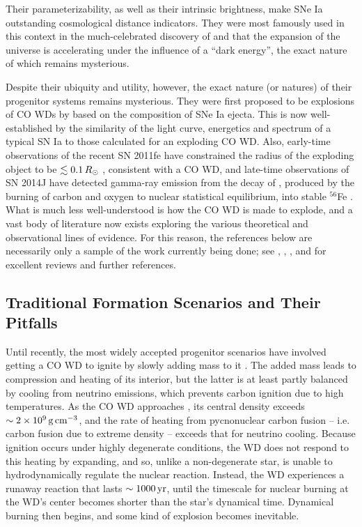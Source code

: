 Their parameterizability, as well as their intrinsic brightness, make SNe Ia outstanding cosmological distance indicators.  They were most famously used in this context in the much-celebrated discovery of \citep{ries+98} and \cite{perl+99} that the expansion of the universe is accelerating under the influence of a ``dark energy'', the exact nature of which remains mysterious.

Despite their ubiquity and utility, however, the exact nature (or natures) of their progenitor systems remains mysterious.  They were first proposed to be explosions of CO WDs by \citep{hoylf60} based on the composition of SNe Ia ejecta.  This is now well-established by the similarity of the light curve, energetics and spectrum of a typical SN Ia to those calculated for an exploding CO WD.  Also, early-time observations of the recent SN 2011fe have constrained the radius of the exploding object to be $\lesssim0.1\,\Rsun$ \citep{nuge+11, bloo+12, maozmn14}, consistent with a CO WD, and late-time observations of SN 2014J have detected gamma-ray emission from the decay of \Ni, produced by the burning of carbon and oxygen to nuclear statistical equilibrium, into stable $^{56}$Fe \citep{chur+14}.  What is much less well-understood is how the CO WD is made to explode, and a vast body of literature now exists exploring the various theoretical and observational lines of evidence.  For this reason, the references below are necessarily only a sample of the work currently being done; see \cite{howe11}, \cite{hill+13}, \cite{maozmn14}, and \cite{tsebs15} for excellent reviews and further references.

\subsection{Traditional Formation Scenarios and Their Pitfalls}
\label{ssec:old_typeia}

Until recently, the most widely accepted progenitor scenarios have involved getting a CO WD to ignite by slowly adding mass to it \citep{hilln00}.  The added mass leads to compression and heating of its interior, but the latter is at least partly balanced by cooling from neutrino emissions, which prevents carbon ignition due to high temperatures.  As the CO WD approaches \Mch, its central density exceeds $\sim2\times10^9\,\gcc$, and the rate of heating from pycnonuclear carbon fusion -- i.e. carbon fusion due to extreme density -- exceeds that for neutrino cooling.  Because ignition occurs under highly degenerate conditions, the WD does not respond to this heating by expanding, and so, unlike a non-degenerate star, is unable to hydrodynamically regulate the nuclear reaction.  Instead, the WD experiences a runaway reaction that lasts $\sim1000\,\mathrm{yr}$, until the timescale for nuclear burning at the WD's center becomes shorter than the star's dynamical time.  Dynamical burning then begins, and some kind of explosion becomes inevitable.

